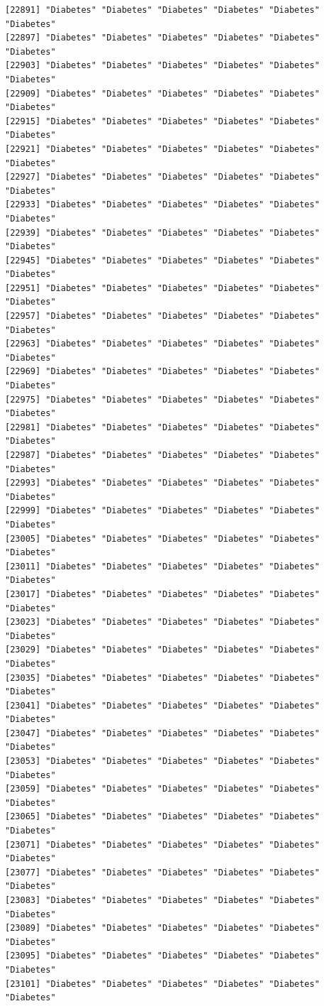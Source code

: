 \documentclass[
  letterpaper,
  DIV=11,
  numbers=noendperiod]{scrartcl}
\begin{document}
\begin{verbatim}
[22891] "Diabetes" "Diabetes" "Diabetes" "Diabetes" "Diabetes" "Diabetes"
[22897] "Diabetes" "Diabetes" "Diabetes" "Diabetes" "Diabetes" "Diabetes"
[22903] "Diabetes" "Diabetes" "Diabetes" "Diabetes" "Diabetes" "Diabetes"
[22909] "Diabetes" "Diabetes" "Diabetes" "Diabetes" "Diabetes" "Diabetes"
[22915] "Diabetes" "Diabetes" "Diabetes" "Diabetes" "Diabetes" "Diabetes"
[22921] "Diabetes" "Diabetes" "Diabetes" "Diabetes" "Diabetes" "Diabetes"
[22927] "Diabetes" "Diabetes" "Diabetes" "Diabetes" "Diabetes" "Diabetes"
[22933] "Diabetes" "Diabetes" "Diabetes" "Diabetes" "Diabetes" "Diabetes"
[22939] "Diabetes" "Diabetes" "Diabetes" "Diabetes" "Diabetes" "Diabetes"
[22945] "Diabetes" "Diabetes" "Diabetes" "Diabetes" "Diabetes" "Diabetes"
[22951] "Diabetes" "Diabetes" "Diabetes" "Diabetes" "Diabetes" "Diabetes"
[22957] "Diabetes" "Diabetes" "Diabetes" "Diabetes" "Diabetes" "Diabetes"
[22963] "Diabetes" "Diabetes" "Diabetes" "Diabetes" "Diabetes" "Diabetes"
[22969] "Diabetes" "Diabetes" "Diabetes" "Diabetes" "Diabetes" "Diabetes"
[22975] "Diabetes" "Diabetes" "Diabetes" "Diabetes" "Diabetes" "Diabetes"
[22981] "Diabetes" "Diabetes" "Diabetes" "Diabetes" "Diabetes" "Diabetes"
[22987] "Diabetes" "Diabetes" "Diabetes" "Diabetes" "Diabetes" "Diabetes"
[22993] "Diabetes" "Diabetes" "Diabetes" "Diabetes" "Diabetes" "Diabetes"
[22999] "Diabetes" "Diabetes" "Diabetes" "Diabetes" "Diabetes" "Diabetes"
[23005] "Diabetes" "Diabetes" "Diabetes" "Diabetes" "Diabetes" "Diabetes"
[23011] "Diabetes" "Diabetes" "Diabetes" "Diabetes" "Diabetes" "Diabetes"
[23017] "Diabetes" "Diabetes" "Diabetes" "Diabetes" "Diabetes" "Diabetes"
[23023] "Diabetes" "Diabetes" "Diabetes" "Diabetes" "Diabetes" "Diabetes"
[23029] "Diabetes" "Diabetes" "Diabetes" "Diabetes" "Diabetes" "Diabetes"
[23035] "Diabetes" "Diabetes" "Diabetes" "Diabetes" "Diabetes" "Diabetes"
[23041] "Diabetes" "Diabetes" "Diabetes" "Diabetes" "Diabetes" "Diabetes"
[23047] "Diabetes" "Diabetes" "Diabetes" "Diabetes" "Diabetes" "Diabetes"
[23053] "Diabetes" "Diabetes" "Diabetes" "Diabetes" "Diabetes" "Diabetes"
[23059] "Diabetes" "Diabetes" "Diabetes" "Diabetes" "Diabetes" "Diabetes"
[23065] "Diabetes" "Diabetes" "Diabetes" "Diabetes" "Diabetes" "Diabetes"
[23071] "Diabetes" "Diabetes" "Diabetes" "Diabetes" "Diabetes" "Diabetes"
[23077] "Diabetes" "Diabetes" "Diabetes" "Diabetes" "Diabetes" "Diabetes"
[23083] "Diabetes" "Diabetes" "Diabetes" "Diabetes" "Diabetes" "Diabetes"
[23089] "Diabetes" "Diabetes" "Diabetes" "Diabetes" "Diabetes" "Diabetes"
[23095] "Diabetes" "Diabetes" "Diabetes" "Diabetes" "Diabetes" "Diabetes"
[23101] "Diabetes" "Diabetes" "Diabetes" "Diabetes" "Diabetes" "Diabetes"

\end{verbatim}
\end{document}
